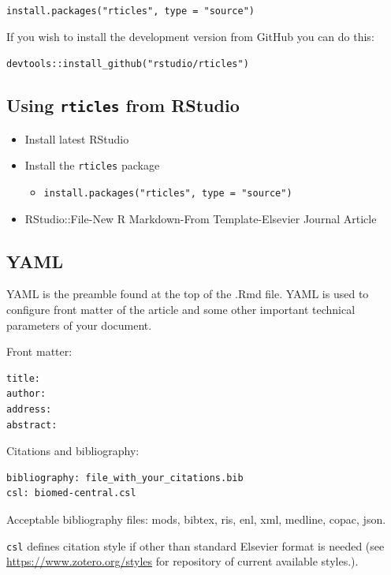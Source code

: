 \documentclass[]{book}
\providecommand{\tightlist}{%
  \setlength{\itemsep}{0pt}\setlength{\parskip}{0pt}}
\begin{document}
\texttt{install.packages("rticles",\ type\ =\ "source")}

If you wish to install the development version from GitHub you can do
this:

\texttt{devtools::install\_github("rstudio/rticles")}

\subsection{\texorpdfstring{Using \texttt{rticles} from
RStudio}{Using rticles from RStudio}}\label{using-rticles-from-rstudio}

\begin{itemize}
\tightlist
\item
  Install latest RStudio
\item
  Install the \texttt{rticles} package

  \begin{itemize}
  \tightlist
  \item
    \texttt{install.packages("rticles",\ type\ =\ "source")}
  \end{itemize}
\item
  RStudio::File-New R Markdown-From Template-Elsevier Journal Article
\end{itemize}

\subsection{YAML}\label{yaml}

YAML is the preamble found at the top of the .Rmd file. YAML is used to
configure front matter of the article and some other important technical
parameters of your document.

Front matter:

\begin{verbatim}
title:
author:
address:
abstract:
\end{verbatim}

Citations and bibliography:

\begin{verbatim}
bibliography: file_with_your_citations.bib
csl: biomed-central.csl
\end{verbatim}

Acceptable bibliography files: mods, bibtex, ris, enl, xml, medline,
copac, json.

\texttt{csl} defines citation style if other than standard Elsevier
format is needed (see \url{https://www.zotero.org/styles} for repository
of current available styles.).
\end{document}
